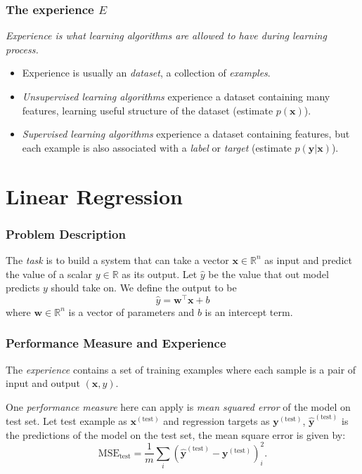 \documentclass{beamer}
\begin{document}
\begin{frame}
  \frametitle{The experience $E$}

  \emph{Experience is what learning algorithms are allowed to have during learning process.}

  \begin{itemize}
    \item[\ding{229}] Experience is usually an \emph{dataset}, a collection of \emph{examples}.
    \item[\ding{229}] \emph{Unsupervised learning algorithms} experience a dataset containing many features, learning useful structure of the dataset (estimate $p(\mathbf{x})$).
    \item[\ding{229}] \emph{Supervised learning algorithms} experience a dataset containing features, but each example is also associated with a \emph{label} or \emph{target} (estimate $p(\mathbf{y}|\mathbf{x})$).
  \end{itemize}
  
\end{frame}

\section{Linear Regression}

\begin{frame}
  \frametitle{Problem Description}

  The \emph{task} is to build a system that can take a vector $\mathbf{x}\in\mathbb{R}^{n}$ as input and predict the value of a scalar $y\in\mathbb{R}$ as its output. Let $\hat{y}$ be the value that out model predicts $y$ should take on. We define the output to be
  \begin{equation*}
    \hat{y}=\mathbf{w}^{\top}\mathbf{x}+b
  \end{equation*}
  where $\mathbf{w}\in\mathbb{R}^{n}$ is a vector of parameters and $b$ is an intercept term.
\end{frame}

\begin{frame}
  \frametitle{Performance Measure and Experience}

  The \emph{experience} contains a set of training examples where each sample is a pair of input and output $(\mathbf{x}, y)$.

  One \emph{performance measure} here can apply is \emph{mean squared error} of the model on test set. Let test example as $\mathbf{x}^{(\text{test})}$ and regression targets as $\mathbf{y}^{(\text{test})}$, $\hat{\mathbf{y}}^{(\text{test})}$ is the predictions of the model on the test set, the mean square error is given by:
  \begin{equation*}
      \text{MSE}_{\text{test}}=\frac{1}{m}\sum_{i}(\hat{\mathbf{y}}^{(\text{test})}-\mathbf{y}^{(\text{test})})_{i}^{2}.
  \end{equation*}
\end{frame}
\end{document}
